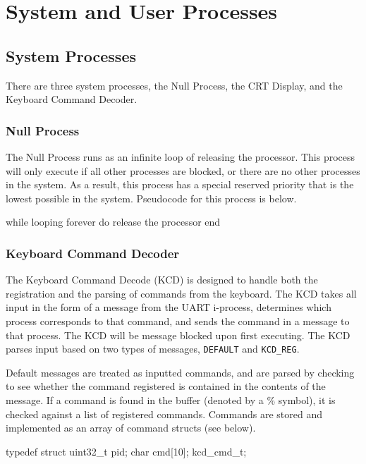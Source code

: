 \documentclass[se]{uw-wkrpt}
\begin{document}
\section{System and User Processes}\label{sec:proc}

\subsection{System Processes}

There are three system processes, the Null Process, the CRT Display, and the Keyboard Command Decoder.

\subsubsection{Null Process}

The Null Process runs as an infinite loop of releasing the processor. This process will only execute if all other processes are blocked, or there are no other processes in the system. As a result, this process has a special reserved priority that is the lowest possible in the system. Pseudocode for this process is below.

\begin{code}
while looping forever do
    release the processor
end
\end{code}

\subsubsection{Keyboard Command Decoder}

The Keyboard Command Decode (KCD) is designed to handle both the registration and the parsing of commands from the keyboard. The KCD takes all input in the form of a message from the UART i-process, determines which process corresponds to that command, and sends the command in a message to that process. The KCD will be message blocked upon first executing. The KCD parses input based on two types of messages, \texttt{DEFAULT} and \texttt{KCD\_REG}.

Default messages are treated as inputted commands, and are parsed by checking to see whether the command registered is contained in the contents of the message. If a command is found in the buffer (denoted by a \% symbol), it is checked against a list of registered commands. Commands are stored and implemented as an array of command structs (see below).
\begin{code}
typedef struct {
    uint32_t pid;
    char cmd[10];
} kcd_cmd_t;
\end{code}
\end{document}
